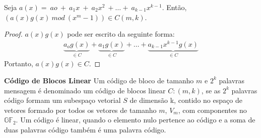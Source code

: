 \begin{proposition} Seja $a(x)= \ ao\ +\ a_1x\ +\ a_2x^2\ + \ldots +\ a_{k-1}x^{k-1}$. Então, $(a(x)g(x)\ mod\ (x^m -1)) \in C(m,k)$.
\end{proposition}

\begin{proof} $a(x)g(x)$ pode ser escrito da seguinte forma: 
\begin{align*}
\underbrace{a_og(x)}_{\in C} + \underbrace{a_1g(x)}_{\in C} + \ldots + \underbrace{a_{k-1}x^{k-1}g(x)}_{\in C}
\end{align*}
Portanto,  $a(x)g(x) \in C$.  
\end{proof}

\begin{definition} {\bf Código de Blocos Linear} \label{CodBlocLin}  Um código de bloco de tamanho $m$ e $2^k$ palavras mensagem é denominado um código de blocos linear $C:(m,k)$, se as $2^k$ palavras código formam um subespaço vetorial $S$ de dimensão k, contido no espaço de vetores formado por todos os vetores de tamanho $m$, $V_m$, com componentes no $\mathbb{GF}_2$. Um código é linear, quando o elemento  nulo pertence ao código e a soma de duas palavras código também é uma palavra código.
\end{definition}

